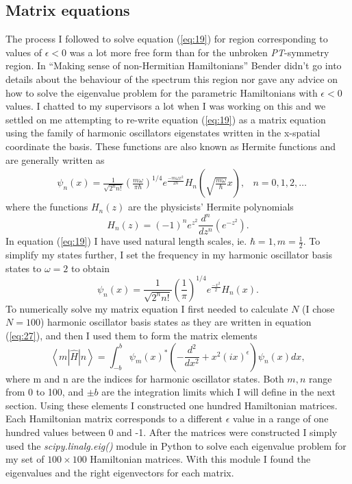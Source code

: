 \documentclass[10pt, a4paper, singlespacing]{report}
\newcommand\PT{\emph{PT}}
\begin{document}
\subsection{Matrix equations}\label{Matrix equations}
The process I followed to solve equation (\ref{eq:19}) for region corresponding to values of $\epsilon < 0$ was a lot more free form than for the unbroken \PT-symmetry region. In ``Making sense of non-Hermitian Hamiltonians'' Bender didn't go into details about the behaviour of the spectrum this region nor gave any advice on how to solve the eigenvalue problem for the parametric Hamiltonians with $\epsilon < 0$ values. I chatted to my supervisors a lot when I was working on this and we settled on me attempting to re-write equation (\ref{eq:19}) as a matrix equation using the family of harmonic oscillators eigenstates written in the x-spatial coordinate the basis. These functions are also known as Hermite functions and are generally written as
\begin{align} \label{eq:25}
&\psi_n(x)= \frac{1}{\sqrt{2^n n!}} 
\left ( \frac{m \omega}{\pi \hbar}\right )^{1/4} e^{\frac{-m \omega x^2}{2 \hbar}}
H_n \left (\sqrt{\frac{m \omega}{\hbar}}x\right ), &n = 0, 1, 2, \dots
\end{align}
where the functions $H_n(z)$ are the physicists' Hermite polynomials
\begin{equation} \label{eq:26}
H_n(z) = (-1)^n e^{z^2} \frac{d^n}{dz^n}\left( e^{-z^2}\right).
\end{equation}
In equation (\ref{eq:19}) I have used natural length scales, ie. $\hbar = 1, m = \frac{1}{2}$. To simplify my states further, I set the frequency in my harmonic oscillator basis states to $\omega = 2$ to obtain
\begin{equation} \label{eq:27}
\psi_n(x)= \frac{1}{\sqrt{2^n n!}} 
\left ( \frac{1}{\pi}\right )^{1/4} e^{\frac{-x^2}{2}}
H_n (x).
\end{equation}
To numerically solve my matrix equation I first needed to calculate $N$ (I chose $N = 100$) harmonic oscillator basis states as they are written in equation (\ref{eq:27}), and then I used them to form the matrix elements 
\begin{equation}\label{eq:28}
\left \langle m \left |\hat{H} \right|n \right \rangle = \int_{-b}^{b} \psi_m(x)^* \left ( - \frac{d^2}{dx^2} + x^2(ix)^{\epsilon}\right ) \psi_n(x) dx,
\end{equation}
where m and n are the indices for harmonic oscillator states. Both $m, n$ range from 0 to 100, and $\pm b$ are the integration limits which I will define in the next section. Using these elements I constructed one hundred Hamiltonian matrices. Each Hamiltonian matrix corresponds to a different $\epsilon$ value in a range of one hundred values between 0 and -1. 
After the matrices were constructed I simply used the \emph{scipy.linalg.eig()} module in Python to solve each eigenvalue problem for my set of $100\times100$ Hamiltonian matrices. With this module I found the eigenvalues and the right eigenvectors for each matrix.
\end{document}

